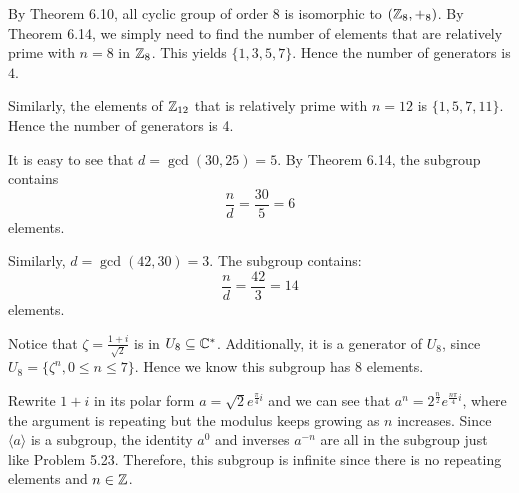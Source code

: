 \documentclass[12pt]{article}
\begin{document}
\begin{problem}[6.9]
	By Theorem 6.10, all cyclic group of order $ 8$ is isomorphic to  $ ( \mathbb{Z}_8,+_{ 8} )$. By Theorem 6.14, we simply need to find the number of elements that are relatively prime with $ n=8$ in $ \mathbb{Z}_8$. This yields $ \{1,3,5,7\} $. Hence the number of generators is $ 4$. 
\end{problem}

\begin{problem}[6.10]
Similarly, the elements of $ \mathbb{Z}_{12}$ that is relatively prime with $n=12$ is $ \{1,5,7,11\} $. Hence the number of generators is 4.
\end{problem}

\begin{problem}[6.17]
It is easy to see that $ d= \gcd ( 30,25) =5 $. By Theorem 6.14, the subgroup contains
\[
\frac{n}{d} = \frac{30}{5}=6
\]
elements.
\end{problem}

\begin{problem}[6.18]
Similarly, $ d= \gcd ( 42,30) =3 $. The subgroup contains:
\[
\frac{n}{d} = \frac{42}{3} =14
\] 
elements.
\end{problem}

\begin{problem}[6.20]
	Notice that $ \zeta = \frac{1+i}{\sqrt{2} }$ is in $ U_8 \subseteq \mathbb{C}^* $. Additionally, it is a generator of $ U_8$, since  $U_8 = \{\zeta^{n}, 0\leq n \leq 7\}$. Hence we know this subgroup has 8 elements.
\end{problem}

\begin{problem}[6.21]
Rewrite $ 1+i$ in its polar form $a=\sqrt{2}  e^{\frac{\pi}{4}i}$ and we can see that $ a^{n} = 2^{\frac{n}{2}} e^{\frac{n\pi}{4}i}$, where the argument is repeating but the modulus keeps growing as $ n$ increases. Since $ \langle a \rangle$ is a subgroup, the identity $ a^{0}$ and inverses $ a^{-n}$ are all in the subgroup just like Problem 5.23. Therefore, this subgroup is infinite since there is no repeating elements and $ n \in \mathbb{Z}$.
\end{problem}
\end{document}
